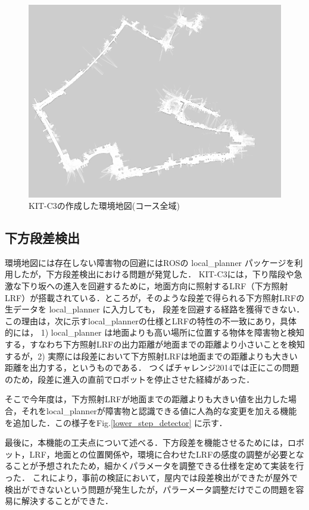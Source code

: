 \documentclass[10pt,a4paper]{jarticle}
\begin{document}
\begin{figure}
  \centering
  \includegraphics[width=14cm]{fig/png/gridmap.png}
  \caption{KIT-C3の作成した環境地図(コース全域)}
  \label{204704_18Dec14}
\end{figure}
\subsection{下方段差検出}
環境地図には存在しない障害物の回避にはROSの local\_planner パッケージを利用したが，下方段差検出における問題が発覚した．
KIT-C3には，下り階段や急激な下り坂への進入を回避するために，地面方向に照射するLRF（下方照射LRF）が搭載されている．ところが，そのような段差で得られる下方照射LRFの生データを local\_planner に入力しても，
段差を回避する経路を獲得できない．この理由は，次に示すlocal\_plannerの仕様とLRFの特性の不一致にあり，具体的には，
1)  local\_planner は地面よりも高い場所に位置する物体を障害物と検知する，すなわち下方照射LRFの出力距離が地面までの距離より小さいことを検知するが，2) 実際には段差において下方照射LRFは地面までの距離よりも大きい距離を出力する，というものである．
つくばチャレンジ2014では正にこの問題のため，段差に進入の直前でロボットを停止させた経緯があった．

そこで今年度は，下方照射LRFが地面までの距離よりも大きい値を出力した場合，それをlocal\_plannerが障害物と認識できる値に人為的な変更を加える機能を追加した．この様子をFig.\ref{lower_step_detector} に示す．

最後に，本機能の工夫点について述べる．下方段差を機能させるためには，ロボット，LRF，地面との位置関係や，環境に合わせたLRFの感度の調整が必要となることが予想されたため，細かくパラメータを調整できる仕様を定めて実装を行った．
これにより，事前の検証において，屋内では段差検出ができたが屋外で検出ができないという問題が発生したが，パラーメータ調整だけでこの問題を容易に解決することができた．
\end{document}
